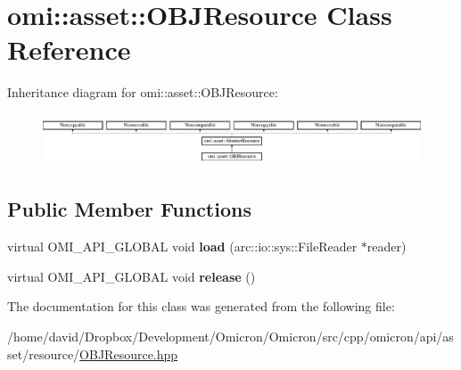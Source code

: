\hypertarget{classomi_1_1asset_1_1_o_b_j_resource}{}\section{omi\+:\+:asset\+:\+:O\+B\+J\+Resource Class Reference}
\label{classomi_1_1asset_1_1_o_b_j_resource}
Inheritance diagram for omi\+:\+:asset\+:\+:O\+B\+J\+Resource\+:\begin{figure}[H]
\begin{center}
\leavevmode
\includegraphics[height=1.546961cm]{classomi_1_1asset_1_1_o_b_j_resource}
\end{center}
\end{figure}
\subsection*{Public Member Functions}
\begin{DoxyCompactItemize}
\item 
virtual O\+M\+I\+\_\+\+A\+P\+I\+\_\+\+G\+L\+O\+B\+AL void {\bfseries load} (arc\+::io\+::sys\+::\+File\+Reader $\ast$reader)\hypertarget{classomi_1_1asset_1_1_o_b_j_resource_a6cb28146fb0875b59dc19d937a48c34b}{}\label{classomi_1_1asset_1_1_o_b_j_resource_a6cb28146fb0875b59dc19d937a48c34b}

\item 
virtual O\+M\+I\+\_\+\+A\+P\+I\+\_\+\+G\+L\+O\+B\+AL void {\bfseries release} ()\hypertarget{classomi_1_1asset_1_1_o_b_j_resource_a90b2328900d521d302d7a355655cafff}{}\label{classomi_1_1asset_1_1_o_b_j_resource_a90b2328900d521d302d7a355655cafff}

\end{DoxyCompactItemize}


The documentation for this class was generated from the following file\+:\begin{DoxyCompactItemize}
\item 
/home/david/\+Dropbox/\+Development/\+Omicron/\+Omicron/src/cpp/omicron/api/asset/resource/\hyperlink{_o_b_j_resource_8hpp}{O\+B\+J\+Resource.\+hpp}\end{DoxyCompactItemize}
